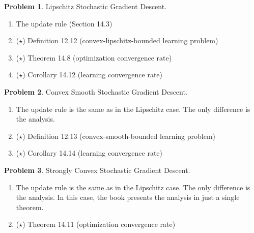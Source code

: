 \documentclass[10pt]{article}
\theoremstyle{definition}
\newtheorem{problem}{Problem}
\begin{document}
\newpage
\begin{problem}
    Lipschitz Stochastic Gradient Descent.
    \begin{enumerate}
        \item The update rule (Section 14.3)
            \newpage
        \item ($\star$) Definition 12.12 (convex-lipschitz-bounded learning problem)
            \vspace{4.5in}
        \item ($\star$) Theorem 14.8  (optimization convergence rate)
            \vspace{4.5in}
        \item ($\star$) Corollary 14.12 (learning convergence rate)
    \end{enumerate}
\end{problem}

\newpage
\begin{problem}
    Convex Smooth Stochastic Gradient Descent.
    \begin{enumerate}
        \item 
            The update rule is the same as in the Lipschitz case.
            The only difference is the analysis.
        \item ($\star$) Definition 12.13 (convex-smooth-bounded learning problem)
            \vspace{4in}
        \item ($\star$) Corollary 14.14 (learning convergence rate)
    \end{enumerate}
\end{problem}

\newpage
\begin{problem}
    Strongly Convex Stochastic Gradient Descent.
    \begin{enumerate}
        \item 
            The update rule is the same as in the Lipschitz case.
            The only difference is the analysis.
            In this case, the book presents the analysis in just a single theorem.
        \item ($\star$) Theorem 14.11 (optimization convergence rate)
    \end{enumerate}
\end{problem}

\newpage
\end{document}
